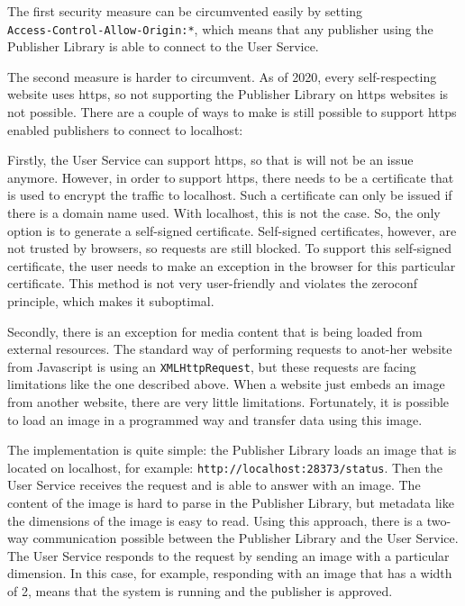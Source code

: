 The first security measure can be circumvented easily by setting \\\texttt{Access-Control-Allow-Origin:*}, which means that any publisher using the Publisher Library is able to connect to the User Service. 

The second measure is harder to circumvent. As of 2020, every self-respecting website uses https, so not supporting the Publisher Library on https websites is not possible. There are a couple of ways to make is still possible to support https enabled publishers to connect to localhost:
 
Firstly, the User Service can support https, so that is will not be an issue anymore. However, in order to support https, there needs to be a certificate that is used to encrypt the traffic to localhost. Such a certificate can only be issued if there is a domain name used. With localhost, this is not the case. So, the only option is to generate a self-signed certificate. Self-signed certificates, however, are not trusted by browsers, so requests are still blocked. To support this self-signed certificate, the user needs to make an exception in the browser for this particular certificate. This method is not very user-friendly and violates the zeroconf principle, which makes it suboptimal.

Secondly, there is an exception for media content that is being loaded from external resources. The standard way of performing requests to anot-her website from Javascript is using an \texttt{XMLHttpRequest}, but these requests are facing limitations like the one described above. When a website just embeds an image from another website, there are very little limitations. Fortunately, it is possible to load an image in a programmed way and transfer data using this image.

The implementation is quite simple: the Publisher Library loads an image that is located on localhost, for example: \texttt{http://localhost:28373/status}. Then the User Service receives the request and is able to answer with an image. The content of the image is hard to parse in the Publisher Library, but metadata like the dimensions of the image is easy to read. Using this approach, there is a two-way communication possible between the Publisher Library and the User Service. The User Service responds to the request by sending an image with a particular dimension. In this case, for example, responding with an image that has a width of 2, means that the system is running and the publisher is approved.

